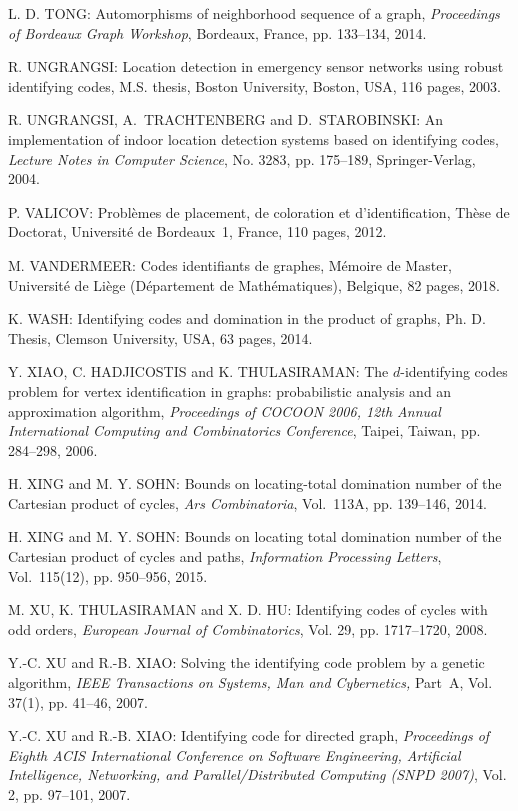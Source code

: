 \begin{thebibliography}{999}
L. D. TONG: Automorphisms of neighborhood sequence of a graph, {\it Proceedings of Bordeaux Graph Workshop}, Bordeaux, France, pp. 133--134, 2014.

R. UNGRANGSI: Location detection in emergency sensor networks using robust identifying codes, M.S. thesis, Boston University, Boston, USA, 116 pages, 2003.

R. UNGRANGSI, A.~TRACHTENBERG and D.~STAROBINSKI: An implementation of indoor location detection systems based on identifying codes, {\it Lecture Notes in Computer Science}, No. 3283, pp. 175--189, Springer-Verlag, 2004.

P. VALICOV: Probl\`emes de placement, de coloration et d'identification, Th\`ese de Doctorat, Universit\'e de Bordeaux~1, France, 110 pages, 2012.

M. VANDERMEER: Codes identifiants de graphes, M\'emoire de Master, Universit\'e de Li\`ege (D\'epartement de Math\'e\-matiques), Belgique, 82 pages, 2018.

K. WASH: Identifying codes and domination in the product of graphs, Ph. D. Thesis, Clemson University, USA, 63 pages, 2014.

Y. XIAO, C. HADJICOSTIS and K. THULASIRAMAN: The $d$-identifying codes problem for vertex identification in graphs: probabilistic analysis and an approximation algorithm, {\it Proceedings of COCOON 2006, 12th Annual International Computing and Combinatorics Conference}, Taipei, Taiwan, pp. 284--298, 2006.

H. XING and M. Y. SOHN: Bounds on locating-total domination number of the Cartesian product of cycles, {\it Ars Combinatoria}, Vol.~113A, pp. 139--146, 2014.

H. XING and M. Y. SOHN: Bounds on locating total domination number of the Cartesian product of cycles and paths, {\it Information Processing Letters}, Vol.~115(12), pp. 950--956, 2015.

M. XU, K. THULASIRAMAN and X. D. HU: Identifying codes of cycles with odd orders, {\it European Journal of Combinatorics}, Vol. 29, pp. 1717--1720, 2008.

Y.-C. XU and R.-B. XIAO: Solving the identifying code problem by a genetic algorithm, {\it IEEE Transactions on Systems, Man and Cybernetics,} Part~A, Vol. 37(1), pp. 41--46, 2007.

Y.-C. XU and R.-B. XIAO: Identifying code for directed graph, {\it Proceedings of Eighth ACIS International Conference on Software Engineering, Artificial Intelligence, Networking, and Parallel/Distributed Computing (SNPD 2007)}, Vol. 2, pp. 97--101, 2007.


\end{thebibliography}
